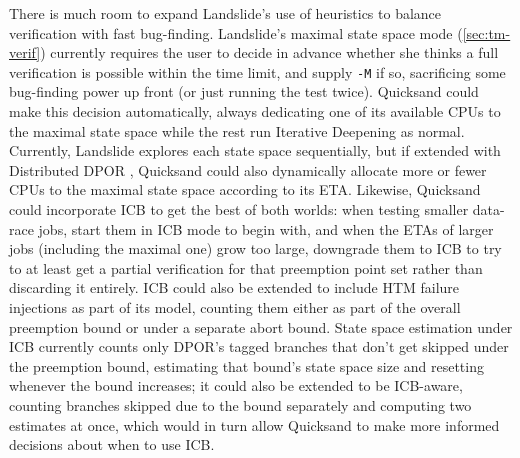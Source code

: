 There is much room to expand Landslide's use of heuristics to balance verification with fast bug-finding.
Landslide's maximal state space mode (\cref{sec:tm-verif}) currently requires the user to decide in advance
whether she thinks a full verification is possible within the time limit,
and supply {\tt -M} if so,
sacrificing some bug-finding power up front
(or just running the test twice).
Quicksand could make this decision automatically,
always dedicating one of its available CPUs to the maximal state space
while the rest run Iterative Deepening as normal.
Currently, Landslide explores each state space sequentially,
but if extended with Distributed DPOR \cite{parallel-dpor},
Quicksand could also dynamically allocate more or fewer CPUs to the maximal state space according to its ETA.
Likewise, Quicksand could
incorporate ICB \cite{chess-icb}
to get the best of both worlds:
when testing smaller data-race jobs,
start them in ICB mode to begin with,
and when the ETAs of larger jobs (including the maximal one) grow too large,
downgrade them to ICB to try to at least get a partial verification for that preemption point set
rather than discarding it entirely.
ICB could also be extended to include HTM failure injections as part of its model,
counting them either as part of the overall preemption bound
or under a separate abort bound.
State space estimation under ICB currently
counts only DPOR's tagged branches that don't get skipped under the preemption bound,
estimating that bound's state space size
and resetting whenever the bound increases;
it could also be extended to be ICB-aware,
counting branches skipped due to the bound separately
and computing two estimates at once,
which would in turn allow Quicksand to make more informed decisions about when to use ICB.


